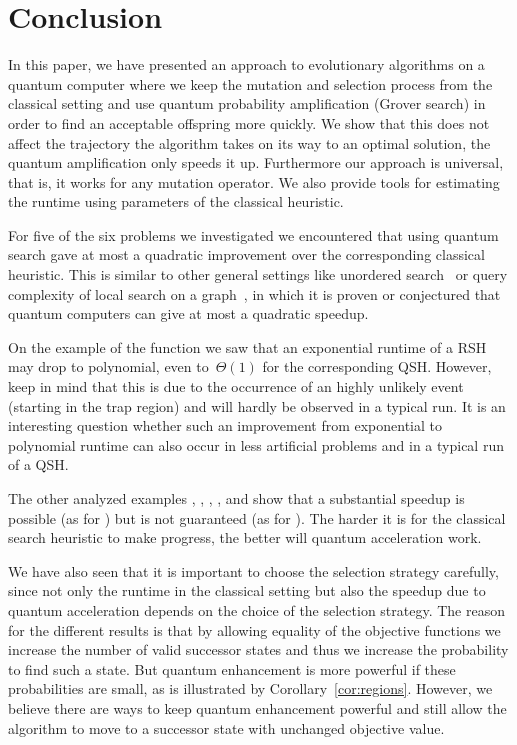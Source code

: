 \documentclass[a4paper,11pt]{article}
\begin{document}
\section{Conclusion}
\label{sec:conclusion}
In this paper, we have presented an approach to evolutionary algorithms on a quantum computer where we keep the mutation and selection process from the classical setting and use quantum probability amplification (Grover search) in order to find an acceptable offspring more quickly. We show that this does not affect the trajectory the algorithm takes on its way to an optimal solution, the quantum amplification only speeds it up. Furthermore our approach is universal, that is, it works for any mutation operator. We also provide tools for estimating the runtime using parameters of the classical heuristic.

For five of the six problems we investigated we encountered that using quantum search gave at most a quadratic improvement over the corresponding classical heuristic. This is similar to other general settings like unordered search~\cite{BennetBBGV1997,Zalka99} or query complexity of local search on a graph~\cite{Aaronson06}, in which it is proven or conjectured that quantum computers can give at most a quadratic speedup. 

On the example of the function \tinytrap we saw that an exponential runtime of a RSH may drop to polynomial, even to~$\Theta(1)$ for the corresponding QSH. However, keep in mind that this is due to the occurrence of an highly unlikely event (starting in the trap region) and will hardly be observed in a typical run. It is an interesting question whether such an improvement from exponential to polynomial runtime can also occur in less artificial problems and in a typical run of a QSH.

The other analyzed examples \onemax, \leadingones, \discrepancy, \needle, and \jumpm show that a substantial speedup is possible (as for \leadingones) but is not guaranteed (as for \discrepancy). The harder it is for the classical search heuristic to make progress, the better will quantum acceleration work. 

We have also seen that it is important to choose the selection strategy carefully, since not only the runtime in the classical setting but also the speedup due to quantum acceleration depends on the choice of the selection strategy. The reason for the different results is that by allowing equality of the objective functions we increase the number of valid successor states and thus we increase the probability to find such a state. But quantum enhancement is more powerful if these probabilities are small, as is illustrated by Corollary~\ref{cor:regions}. However, we believe there are ways to keep quantum enhancement powerful and still allow the algorithm to move to a successor state with unchanged objective value.
\end{document}
